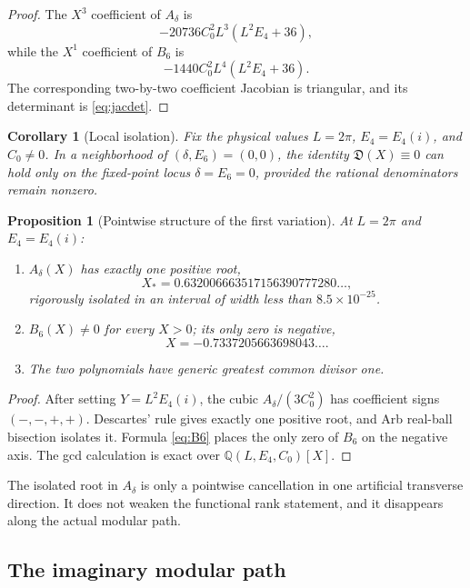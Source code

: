 \documentclass[11pt]{article}
\newtheorem{proposition}[theorem]{Proposition}
\newtheorem{corollary}[theorem]{Corollary}
\theoremstyle{definition}
\theoremstyle{remark}
\newcommand{\Q}{\mathbb{Q}}
\newcommand{\cD}{\mathfrak{D}}
\begin{document}
\begin{proof}
The \(X^3\) coefficient of \(A_\delta\) is
\[
 -20736C_0^2L^3(L^2E_4+36),
\]
while the \(X^1\) coefficient of \(B_6\) is
\[
 -1440C_0^2L^4(L^2E_4+36).
\]
The corresponding two-by-two coefficient Jacobian is triangular, and its determinant is \eqref{eq:jacdet}.
\end{proof}

\begin{corollary}[Local isolation]\label{cor:local}
Fix the physical values \(L=2\pi\), \(E_4=E_4(i)\), and \(C_0\ne0\).  In a neighborhood of \((\delta,E_6)=(0,0)\), the identity \(\cD(X)\equiv0\) can hold only on the fixed-point locus \(\delta=E_6=0\), provided the rational denominators remain nonzero.
\end{corollary}

\begin{proposition}[Pointwise structure of the first variation]\label{prop:roots}
At \(L=2\pi\) and \(E_4=E_4(i)\):
\begin{enumerate}[label=(\roman*)]
 \item \(A_\delta(X)\) has exactly one positive root,
 \[
  X_*=0.632006663517156390777280\ldots,
 \]
 rigorously isolated in an interval of width less than \(8.5\times10^{-25}\).
 \item \(B_6(X)\ne0\) for every \(X>0\); its only zero is negative,
 \[
  X=-0.7337205663698043\ldots.
 \]
 \item The two polynomials have generic greatest common divisor one.
\end{enumerate}
\end{proposition}

\begin{proof}
After setting \(Y=L^2E_4(i)\), the cubic \(A_\delta/(3C_0^2)\) has coefficient signs \((-,-,+,+)\).  Descartes' rule gives exactly one positive root, and Arb real-ball bisection isolates it.  Formula \eqref{eq:B6} places the only zero of \(B_6\) on the negative axis.  The gcd calculation is exact over \(\Q(L,E_4,C_0)[X]\).
\end{proof}

The isolated root in \(A_\delta\) is only a pointwise cancellation in one artificial transverse direction.  It does not weaken the functional rank statement, and it disappears along the actual modular path.

\subsection{The imaginary modular path}
\end{document}
